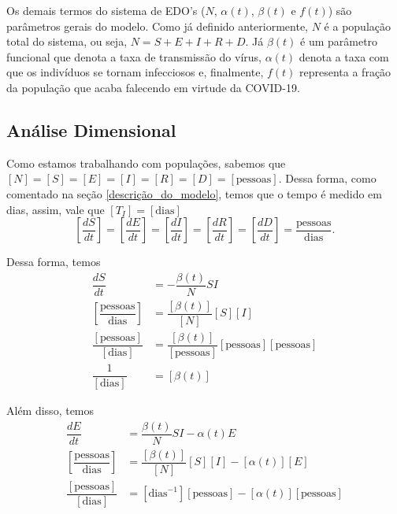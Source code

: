 \documentclass{article}
\begin{document}
	Os demais termos do sistema de EDO's ($N$, $\alpha(t)$, $\beta(t)$ e $f(t)$) são parâmetros gerais do modelo. Como já definido anteriormente, $N$ é a população total do sistema, ou seja, $N = S + E + I + R + D$. Já $\beta(t)$ é um parâmetro funcional que denota a taxa de transmissão do vírus, $\alpha(t)$ denota a taxa com que os indivíduos se tornam infecciosos e, finalmente, $f(t)$ representa a fração da população que acaba falecendo em virtude da COVID-19.
	
	\subsection{Análise Dimensional} \label{analise_dimensional}
	
	Como estamos trabalhando com populações, sabemos que $[N] = [S] = [E] = [I] = [R] = [D] = [\text{pessoas}]$. Dessa forma, como comentado na seção \ref{descrição_do_modelo}, temos que o tempo é medido em dias, assim, vale que $[T_I] = [\text{dias}]$
	\[\left[\dfrac{dS}{dt}\right] = \left[\dfrac{dE}{dt}\right] = \left[\dfrac{dI}{dt}\right] = \left[\dfrac{dR}{dt}\right] = \left[\dfrac{dD}{dt}\right] = \dfrac{\text{pessoas}}{\text{dias}}.\]
	
	Dessa forma, temos
	\begin{equation*}
		\begin{split}
			\dfrac{dS}{dt} & = -\dfrac{\beta(t)}{N}SI \\
			\left[\dfrac{\text{pessoas}}{\text{dias}}\right] & = \dfrac{[\beta(t)]}{[N]}[S][I] \\
			\dfrac{[\text{pessoas}]}{[\text{dias}]} & = \dfrac{[\beta(t)]}{[\text{pessoas}]}[\text{pessoas}][\text{pessoas}] \\
			\dfrac{1}{[\text{dias}]} & = [\beta(t)]
		\end{split}
	\end{equation*}
	
	Além disso, temos
	\begin{equation*}
		\begin{split}
			\dfrac{dE}{dt} & = \dfrac{\beta(t)}{N}SI - \alpha(t) E \\
			\left[\dfrac{\text{pessoas}}{\text{dias}}\right] & = \dfrac{[\beta(t)]}{[N]}[S][I] - [\alpha(t)][E] \\
			\dfrac{[\text{pessoas}]}{[\text{dias}]} & = [\text{dias}^{-1}][\text{pessoas}] - [\alpha(t)][\text{pessoas}]
		\end{split}
	\end{equation*}
	
\end{document}
